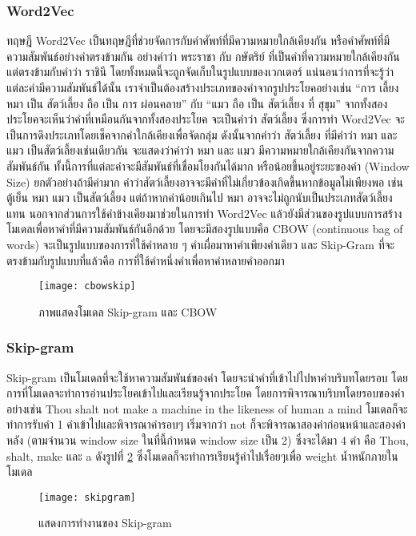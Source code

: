 \subsubsection{Word2Vec}
ทฤษฎี Word2Vec\cite{shortStoryForWord2Vec} เป็นทฤษฎีที่ช่วยจัดการกับคำศัพท์ที่มีความหมายใกล้เคียงกัน หรือคำศัพท์ที่มีความสัมพันธ์อย่างคำตรงข้ามกัน 
อย่างคำว่า พระราชา กับ กษัตริย์ ที่เป็นคำที่ความหมายใกล้เคียงกัน แต่ตรงข้ามกับคำว่า ราชินี โดยทั้งหมดนี้จะถูกจัดเก็บในรูปแบบของเวกเตอร์
แน่นอนว่าการที่จะรู้ว่าแต่ละคำมีความสัมพันธ์ได้นั้น เราจำเป็นต้องสร้างประเภทของคำจากรูปประโยคอย่างเช่น “การ เลี้ยง หมา เป็น สัตว์เลี้ยง ถือ เป็น การ ผ่อนคลาย” 
กับ “แมว ถือ เป็น สัตว์เลี้ยง ที่ สุขุม” จากทั้งสองประโยคจะเห็นว่าคำที่เหมือนกันจากทั้งสองประโยค จะเป็นคำว่า สัตว์เลี้ยง ซึ่งการทำ Word2Vec 
จะเป็นการดึงประเภทโดยเช็คจากคำใกล้เคียงเพื่อจัดกลุ่ม ดังนั้นจากคำว่า สัตว์เลี้ยง ที่มีคำว่า หมา และ แมว เป็นสัตว์เลี้ยงเช่นเดียวกัน จะแสดงว่าคำว่า 
หมา และ แมว มีความหมายใกล้เคียงกันจากความสัมพันธ์กัน ทั้งนี้การที่แต่ละคำจะมีสัมพันธ์ที่เชื่อมโยงกันได้มาก หรือน้อยขึ้นอยู่ระยะของคำ (Window Size) 
ยกตัวอย่างถ้ามีค่ามาก คำว่าสัตว์เลี้ยงอาจจะมีคำที่ไม่เกี่ยวข้องเกิดขึ้นหากข้อมูลไม่เพียงพอ เช่น ตู้เย็น หมา แมว เป็นสัตว์เลี้ยง แต่ถ้าหากค่าน้อยเกินไป หมา 
อาจจะไม่ถูกนับเป็นประเภทสัตว์เลี้ยงแทน
นอกจากส่วนการใช้คำข้างเคียงมาช่วยในการทำ Word2Vec แล้วยังมีส่วนของรูปแบบการสร้างโมเดลเพื่อหาคำที่มีความสัมพันธ์กันอีกด้วย 
โดยจะมีสองรูปแบบคือ CBOW (continuous bag of words) จะเป็นรูปแบบของการที่ใช้คำหลาย ๆ คำเผื่อมาหาคำเพียงคำเดียว 
และ Skip-Gram ที่จะตรงข้ามกับรูปแบบที่แล้วคือ การที่ใช้คำหนึ่งคำเพื่อหาคำหลายคำออกมา

\begin{figure}[H]
    \centering
    \texttt{[image: cbowskip]}
    \caption{ภาพแสดงโมเดล Skip-gram และ CBOW \cite{ichi}}\label{fig:cbowskip}
\end{figure}

\subsubsection{Skip-gram}

Skip-gram\cite{ichi} เป็นโมเดลที่จะใช้หาความสัมพันธ์ของคำ โดยจะนำคำที่เข้าไปไปหาคำบริบทโดยรอบ โดยการที่โมเดลจะทำการอ่านประโยคเข้าไปและเรียนรู้จากประโยค 
โดยการพิจารณาบริบทโดยรอบของคำ อย่างเช่น Thou shalt not make a machine in the likeness of human a mind โมเดลก็จะทำการรับคำ 
1 คำเข้าไปและพิจารณาคำรอบๆ เริ่มจากว่า not ก็จะพิจารณาสองคำก่อนหน้าและสองคำหลัง (ตามจำนวน window size ในที่นี้กำหนด window size เป็น 2) 
ซึ่งจะได้มา 4 คำ คือ Thou, shalt, make และ a ดังรูปที่ \ref{fig:skipgram} ซึ่งโมเดลก็จะทำการเรียนรู้คำไปเรื่อยๆเพื่อ weight น้ำหนักภายในโมเดล
\begin{figure}[H]
    \centering
    \texttt{[image: skipgram]}
    \caption{แสดงการทำงานของ Skip-gram \cite{ichi}}\label{fig:skipgram}
\end{figure}

